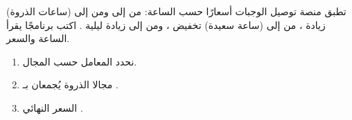 \begin{statement}
تطبق منصة توصيل الوجبات أسعارًا حسب الساعة: من  إلى  ومن  إلى  (ساعات الذروة) زيادة ، من  إلى  (ساعة سعيدة) تخفيض ، ومن  إلى  زيادة ليلية . اكتب برنامجًا يقرأ الساعة والسعر.
\end{statement}
\begin{stepsbox}\begin{enumerate}
\item نحدد المعامل  حسب المجال.
\item مجالا الذروة يُجمعان بـ \code{||}.
\item السعر النهائي .
\end{enumerate}\end{stepsbox}
